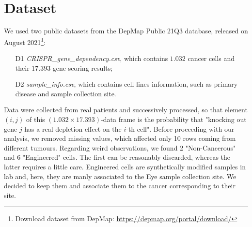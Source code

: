 \documentclass[a4paper,11pt, oneside]{article}  %
\begin{document}
\section{Dataset}
We used two public datasets from the DepMap Public 21Q3 database,  released on August 2021\footnote{Download dataset from DepMap:  \url{https://depmap.org/portal/download/}}:
\begin{itemize}
	\item[D1] \textit{CRISPR\_gene\_dependency.csv},  which contains $1.032$ cancer cells and their $17.393$ gene scoring results;
	\item[D2] \textit{sample\_info.csv}, which contains cell lines information,  such as primary disease and sample collection site.
\end{itemize}
Data were collected from real patients and successively processed,  so that element $(i, j)$ of this $(1.032 \times 17.393)$-data frame is the probability that "knocking out gene $j$ has a real depletion effect on the $i$-th cell".
Before proceeding with our analysis, we removed missing values, which affected only 10 rows coming from different tumours. Regarding weird observations, we found $2$ "Non-Cancerous" and $6$ "Engineered" cells. The first can be reasonably discarded, whereas the latter requires a little care. Engineered cells are synthetically modified samples in lab and, here, they are manly associated to the Eye sample collection site. We decided to keep them and associate them to the cancer corresponding to their site. 
\end{document}
